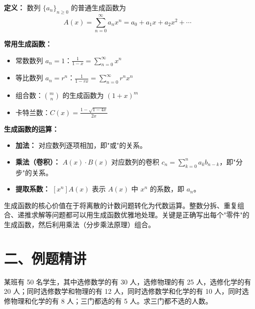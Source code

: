 \documentclass[12pt, a4paper]{ctexart}
\begin{document}
\begin{knowledgebox}
\textbf{定义：} 数列 \(\{a_n\}_{n\ge 0}\) 的普通生成函数为
\[
A(x) = \sum_{n=0}^{\infty} a_n x^n = a_0 + a_1 x + a_2 x^2 + \cdots
\]

\textbf{常用生成函数：}
\begin{itemize}[leftmargin=1.5em]
  \item 常数数列 \(a_n=1\)：\(\displaystyle\frac{1}{1-x} = \sum_{n=0}^{\infty} x^n\)
  \item 等比数列 \(a_n=r^n\)：\(\displaystyle\frac{1}{1-rx} = \sum_{n=0}^{\infty} r^n x^n\)
  \item 组合数：\(\displaystyle\binom{m}{n}\) 的生成函数为 \((1+x)^m\)
  \item 卡特兰数：\(C(x) = \displaystyle\frac{1-\sqrt{1-4x}}{2x}\)
\end{itemize}

\textbf{生成函数的运算：}
\begin{itemize}[leftmargin=1.5em]
  \item \textbf{加法：} 对应数列逐项相加，即"或"的关系。
  \item \textbf{乘法（卷积）：} \(A(x) \cdot B(x)\) 对应数列的卷积 \(c_n = \sum_{k=0}^{n} a_k b_{n-k}\)，即"分步"的关系。
  \item \textbf{提取系数：} \([x^n] A(x)\) 表示 \(A(x)\) 中 \(x^n\) 的系数，即 \(a_n\)。
\end{itemize}
\end{knowledgebox}

\begin{tipbox}[规律]
生成函数的核心价值在于将离散的计数问题转化为代数运算。整数分拆、重复组合、递推求解等问题都可以用生成函数优雅地处理。关键是正确写出每个"零件"的生成函数，然后利用乘法（分步乘法原理）组合。
\end{tipbox}

\section*{\textcolor{examorange}{二、例题精讲}}

\begin{examplebox}
某班有 50 名学生，其中选修数学的有 30 人，选修物理的有 25 人，选修化学的有 20 人；同时选修数学和物理的有 12 人，同时选修数学和化学的有 10 人，同时选修物理和化学的有 8 人；三门都选的有 5 人。求三门都不选的人数。
\end{examplebox}
\end{document}
